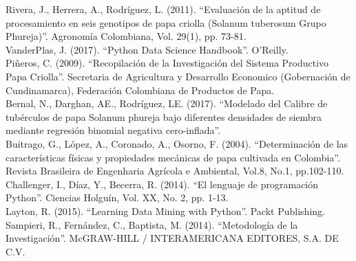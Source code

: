 \noindent
Rivera, J., Herrera, A., Rodríguez, L. (2011). "`Evaluación de la aptitud de procesamiento en seis genotipos de papa criolla (Solanum tuberosum Grupo Phureja)"'. Agronomía Colombiana, Vol. 29(1), pp. 73-81.\\

\noindent
VanderPlas, J. (2017). "`Python Data Science Handbook"'. O’Reilly.\\

\noindent 
Piñeros, C. (2009). "`Recopilación de la Investigación del Sistema Productivo Papa Criolla"'. Secretaria de Agricultura y Desarrollo Economico (Gobernación de Cundinamarca), Federación Colombiana de Productos de Papa.\\

\noindent
Bernal, N., Darghan, AE., Rodríguez, LE. (2017). "`Modelado del Calibre de tubérculos de papa Solanum phureja bajo diferentes densidades de siembra mediante regresión binomial negativa cero-inflada"'.\\

\noindent
Buitrago, G., López, A., Coronado, A., Osorno, F. (2004). "`Determinación de las características físicas y propiedades mecánicas de papa cultivada en Colombia"'. Revista Brasileira de Engenharia Agrícola e Ambiental, Vol.8, No.1, pp.102-110.\\

\noindent
Challenger, I., Díaz, Y., Becerra, R. (2014). "`El lenguaje de programación Python"'. Ciencias Holguín, Vol. XX, No. 2, pp. 1-13.\\

\noindent
Layton, R. (2015). "`Learning Data Mining with Python"'. Packt Publishing.\\

\noindent
Sampieri, R., Fernández, C., Baptista, M. (2014). "`Metodología de la Investigación"'. McGRAW-HILL / INTERAMERICANA EDITORES, S.A. DE C.V.\\

\noindent 


\noindent

\noindent

